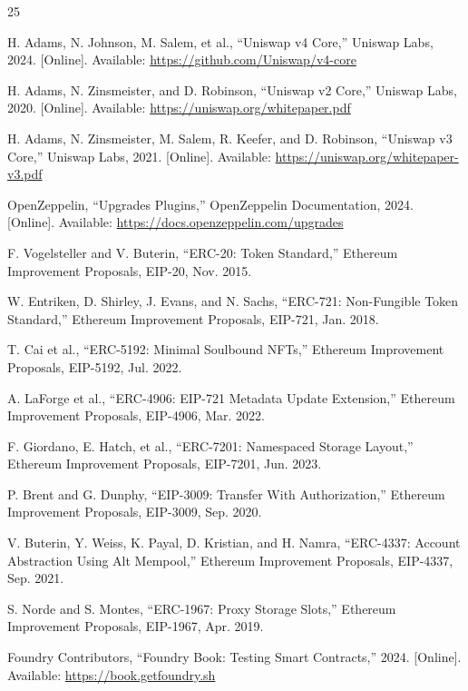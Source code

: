 \documentclass[conference]{IEEEtran}
\begin{document}
\begin{thebibliography}{25}

H. Adams, N. Johnson, M. Salem, et al., ``Uniswap v4 Core,'' Uniswap Labs, 2024. [Online]. Available: \url{https://github.com/Uniswap/v4-core}

H. Adams, N. Zinsmeister, and D. Robinson, ``Uniswap v2 Core,'' Uniswap Labs, 2020. [Online]. Available: \url{https://uniswap.org/whitepaper.pdf}

H. Adams, N. Zinsmeister, M. Salem, R. Keefer, and D. Robinson, ``Uniswap v3 Core,'' Uniswap Labs, 2021. [Online]. Available: \url{https://uniswap.org/whitepaper-v3.pdf}

OpenZeppelin, ``Upgrades Plugins,'' OpenZeppelin Documentation, 2024. [Online]. Available: \url{https://docs.openzeppelin.com/upgrades}

F. Vogelsteller and V. Buterin, ``ERC-20: Token Standard,'' Ethereum Improvement Proposals, EIP-20, Nov. 2015.

W. Entriken, D. Shirley, J. Evans, and N. Sachs, ``ERC-721: Non-Fungible Token Standard,'' Ethereum Improvement Proposals, EIP-721, Jan. 2018.

T. Cai et al., ``ERC-5192: Minimal Soulbound NFTs,'' Ethereum Improvement Proposals, EIP-5192, Jul. 2022.

A. LaForge et al., ``ERC-4906: EIP-721 Metadata Update Extension,'' Ethereum Improvement Proposals, EIP-4906, Mar. 2022.

F. Giordano, E. Hatch, et al., ``ERC-7201: Namespaced Storage Layout,'' Ethereum Improvement Proposals, EIP-7201, Jun. 2023.

P. Brent and G. Dunphy, ``EIP-3009: Transfer With Authorization,'' Ethereum Improvement Proposals, EIP-3009, Sep. 2020.

V. Buterin, Y. Weiss, K. Payal, D. Kristian, and H. Namra, ``ERC-4337: Account Abstraction Using Alt Mempool,'' Ethereum Improvement Proposals, EIP-4337, Sep. 2021.

S. Norde and S. Montes, ``ERC-1967: Proxy Storage Slots,'' Ethereum Improvement Proposals, EIP-1967, Apr. 2019.

Foundry Contributors, ``Foundry Book: Testing Smart Contracts,'' 2024. [Online]. Available: \url{https://book.getfoundry.sh}


\end{thebibliography}
\end{document}
